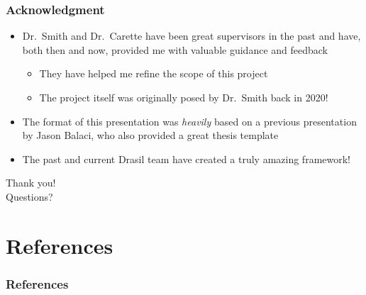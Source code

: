 \documentclass{beamer}
\begin{document}

\begin{frame}
    \frametitle{Acknowledgment}

    \begin{itemize}
        \item Dr.~Smith and Dr.~Carette have been great supervisors in the
              past and have, both then and now, provided me with valuable guidance
              and feedback
              \begin{itemize}
                  \item They have helped me refine the scope of this project
                  \item The project itself was originally posed by Dr.~Smith back
                        in 2020!
              \end{itemize}
        \item<2-> The format of this presentation was \emph{heavily} based on
              a previous presentation by Jason Balaci, who also provided a
              great thesis template
        \item<3-> The past and current Drasil team have created a truly amazing
              framework!
    \end{itemize}
\end{frame}


\begin{frame}
    \center
    \huge{Thank you!}\\
    \normalsize{Questions?}
\end{frame}


\section{References}

\begin{frame}%
    \frametitle{References}

    
    
\end{frame}
\end{document}
